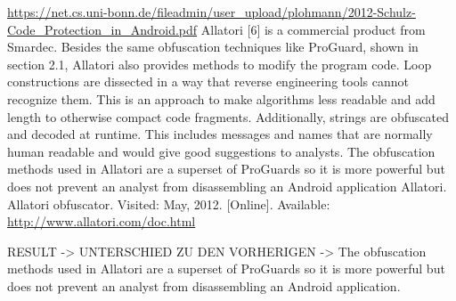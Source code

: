 \url{https://net.cs.uni-bonn.de/fileadmin/user_upload/plohmann/2012-Schulz-Code_Protection_in_Android.pdf}\newline
Allatori [6] is a commercial product from Smardec. Besides the same obfuscation techniques
like ProGuard, shown in section 2.1, Allatori also provides methods to modify the
program code. Loop constructions are dissected in a way that reverse engineering tools
cannot recognize them. This is an approach to make algorithms less readable and add
length to otherwise compact code fragments. Additionally, strings are obfuscated and decoded
at runtime. This includes messages and names that are normally human readable
and would give good suggestions to analysts.
The obfuscation methods used in Allatori are a superset of ProGuards so it is more
powerful but does not prevent an analyst from disassembling an Android application\newline
Allatori. Allatori obfuscator. Visited: May, 2012. [Online]. Available: \url{http://www.allatori.com/doc.html}


RESULT -> UNTERSCHIED ZU DEN VORHERIGEN -> The obfuscation methods used in Allatori are a superset of ProGuards so it is more powerful but does not prevent an analyst from disassembling an Android application.
